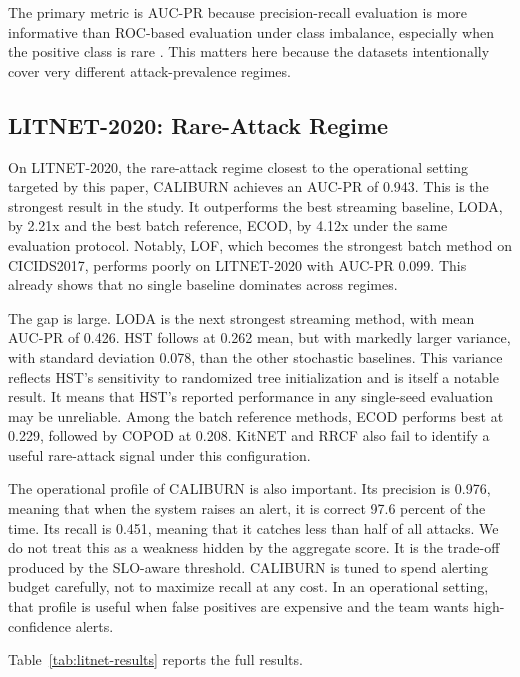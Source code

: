 \documentclass[preprint,12pt,authoryear]{elsarticle}
\newcommand{\caliburn}{CALIBURN}
\begin{document}
The primary metric is AUC-PR because precision-recall evaluation is more informative than ROC-based evaluation under class imbalance, especially when the positive class is rare \citep{saito2015precision}. This matters here because the datasets intentionally cover very different attack-prevalence regimes.

\subsection{LITNET-2020: Rare-Attack Regime}
\label{sec:results-litnet}

On LITNET-2020, the rare-attack regime closest to the operational setting targeted by this paper, \caliburn{} achieves an AUC-PR of 0.943. This is the strongest result in the study. It outperforms the best streaming baseline, LODA, by 2.21x and the best batch reference, ECOD, by 4.12x under the same evaluation protocol. Notably, LOF, which becomes the strongest batch method on CICIDS2017, performs poorly on LITNET-2020 with AUC-PR 0.099. This already shows that no single baseline dominates across regimes.

The gap is large. LODA is the next strongest streaming method, with mean AUC-PR of 0.426. HST follows at 0.262 mean, but with markedly larger variance, with standard deviation 0.078, than the other stochastic baselines. This variance reflects HST's sensitivity to randomized tree initialization and is itself a notable result. It means that HST's reported performance in any single-seed evaluation may be unreliable. Among the batch reference methods, ECOD performs best at 0.229, followed by COPOD at 0.208. KitNET and RRCF also fail to identify a useful rare-attack signal under this configuration.

The operational profile of \caliburn{} is also important. Its precision is 0.976, meaning that when the system raises an alert, it is correct 97.6 percent of the time. Its recall is 0.451, meaning that it catches less than half of all attacks. We do not treat this as a weakness hidden by the aggregate score. It is the trade-off produced by the SLO-aware threshold. \caliburn{} is tuned to spend alerting budget carefully, not to maximize recall at any cost. In an operational setting, that profile is useful when false positives are expensive and the team wants high-confidence alerts.

Table~\ref{tab:litnet-results} reports the full results.
\end{document}
